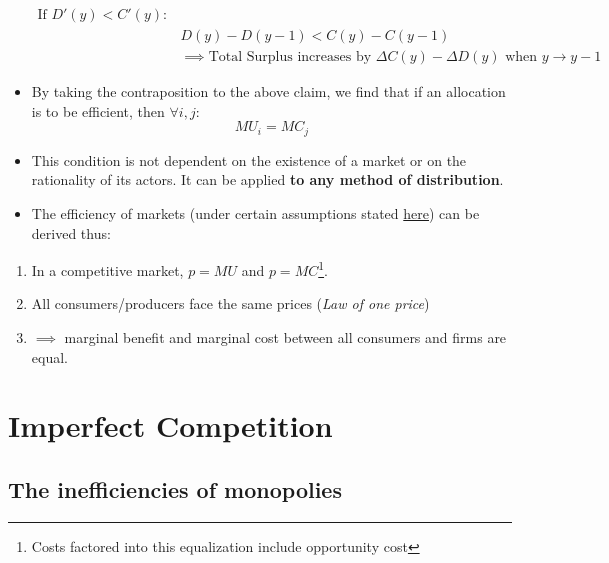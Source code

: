 \documentclass[
]{ltjarticle}
\providecommand{\tightlist}{%
  \setlength{\itemsep}{0pt}\setlength{\parskip}{0pt}}
\begin{document}
\begin{itemize}
\[\begin{aligned}
  \text{If } D'(y) < C'(y):& \\
  & D(y) - D(y-1) < C(y) - C(y-1) \\
  &\implies \text{Total Surplus increases by } \Delta C(y) - \Delta 
  D(y) \text{ when } y \to y - 1
  \end{aligned}\]
\item
  By taking the contraposition to the above claim, we find that if an
  allocation is to be efficient, then \(\forall i, j:\) \[MU_i = MC_j\]
\item
  This condition is not dependent on the existence of a market or on the
  rationality of its actors. It can be applied \textbf{to any method of
  distribution}.
\item
  The efficiency of markets (under certain assumptions stated
  \hyperlink{foo}{here}) can be derived thus:\\
\end{itemize}

\begin{enumerate}
\def\labelenumi{\arabic{enumi}.}
\tightlist
\item
  In a competitive market, \(p = MU\) and
  \(p = MC\)\footnote{Costs factored into this equalization include opportunity cost}.\\
\item
  All consumers/producers face the same prices (\emph{Law of one
  price})\\
\item
  \(\implies\) marginal benefit and marginal cost between all consumers
  and firms are equal.
\end{enumerate}

\hypertarget{imperfect-competition}{%
\section{Imperfect Competition}\label{imperfect-competition}}

\hypertarget{the-inefficiencies-of-monopolies}{%
\subsection{The inefficiencies of
monopolies}\label{the-inefficiencies-of-monopolies}}
\end{document}
